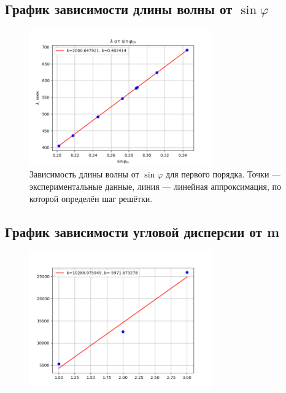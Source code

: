 \documentclass[a4paper, 12pt]{article}
\begin{document}
\subsection{График зависимости длины волны от \(\sin\varphi\)}
\begin{figure}[H]
    \centering
    \includegraphics[width=0.7\textwidth]{data1.png}
    \caption{Зависимость длины волны от \(\sin\varphi\) для первого порядка. Точки --- экспериментальные данные, линия --- линейная аппроксимация, по которой определён шаг решётки.}
    \label{fig:sin}
\end{figure}

\subsection{График зависимости угловой дисперсии от m}
\begin{figure}[H]
    \centering
    \includegraphics[width=0.7\textwidth]{data2.png}
    \label{fig:sosal}
\end{figure}
\end{document}
